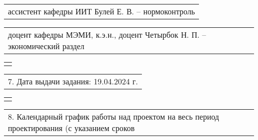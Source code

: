 \documentclass[12pt, А4, twoside]{article}
\begin{document}
\begin{FlushLeft}
    \vspace{-0.1 cm}

    \begin{tabular}{p{17.25cm}} 
        \hspace{0.3cm} \textsf{ассистент кафедры ИИТ Булей Е. В. {--} нормоконтроль} \vspace{0pt} \hline \\
    \end{tabular}

    \vspace{-0.1 cm}

    \begin{tabular}{p{17.25cm}} 
        \hspace{0.3cm} \textsf{доцент кафедры МЭМИ, к.э.н., доцент Четырбок Н. П. {--} экономический раздел} \vspace{0pt} \hline \\
    \end{tabular}   

    \vspace{-0.1 cm}

    \begin{tabular}{p{17.25cm}} 
        \vspace{0pt} \hline \\
    \end{tabular}   

    \vspace{-0.1 cm}

    \begin{tabular}{p{17.25cm}} 
        \textsf{7. Дата выдачи задания: 19.04.2024 г.} \vspace{0pt} \hline \\
    \end{tabular} 

    \vspace{-0.1 cm}

    \begin{tabular}{p{17.25cm}} 
        \vspace{0pt} \hline \\
    \end{tabular} 

    \vspace{-0.1 cm}

    \begin{tabular}{p{17.25cm}} 
        \textsf{8. Календарный график работы над проектом на весь период проектирования (с указанием сроков} \vspace{0pt} \hline \\
    \end{tabular} 


\end{FlushLeft}
\end{document}
